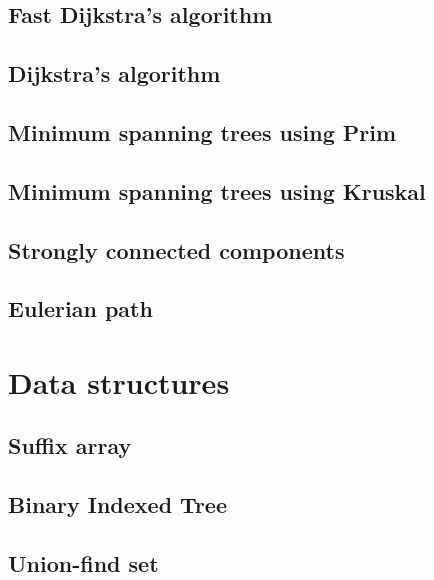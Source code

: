 \subsection{Fast Dijkstra's algorithm}
\raggedbottom
\hrulefill
\subsection{Dijkstra's algorithm}
\raggedbottom
\hrulefill
\subsection{Minimum spanning trees using Prim}
\raggedbottom
\hrulefill
\subsection{Minimum spanning trees using Kruskal}
\raggedbottom
\hrulefill
\subsection{Strongly connected components}
\raggedbottom
\hrulefill
\subsection{Eulerian path}
\raggedbottom
\hrulefill

\section{Data structures}
\subsection{Suffix array}
\raggedbottom
\hrulefill
\subsection{Binary Indexed Tree}
\raggedbottom
\hrulefill
\subsection{Union-find set}
\raggedbottom
\hrulefill
